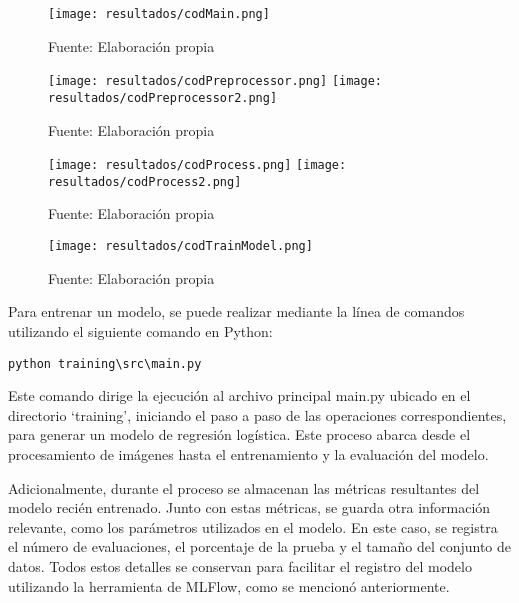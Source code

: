 \newpage

\begin{figure}[h]
\centering
\caption{Código del archivo main.py}
\texttt{[image: resultados/codMain.png]}
\caption*{\footnotesize Fuente: Elaboración propia}
\label{fig:figuraCodMain}
\end{figure}

\newpage

\begin{figure}[h]
\centering
\caption{Código del archivo preprocessor.py}
\texttt{[image: resultados/codPreprocessor.png]}
\texttt{[image: resultados/codPreprocessor2.png]}
\caption*{\footnotesize Fuente: Elaboración propia}
\label{fig:figuraCodPreprocessor}
\end{figure}

\newpage

\begin{figure}[h]
\centering
\caption{Código del archivo process.py}
\texttt{[image: resultados/codProcess.png]}
\texttt{[image: resultados/codProcess2.png]}
\caption*{\footnotesize Fuente: Elaboración propia}
\label{fig:figuraCodProcess}
\end{figure}

\newpage

\begin{figure}[h]
\centering
\caption{Código del archivo train\_model.py}
\texttt{[image: resultados/codTrainModel.png]}
\caption*{\footnotesize Fuente: Elaboración propia}
\label{fig:figuraCodTrainModel}
\end{figure}

Para entrenar un modelo, se puede realizar mediante la línea de comandos utilizando el siguiente comando en Python: 
\begin{verbatim}
python training\src\main.py
\end{verbatim}

\newpage

Este comando dirige la ejecución al archivo principal main.py ubicado en el directorio `training', iniciando el paso a paso de las operaciones correspondientes, para generar un modelo de regresión logística. Este proceso abarca desde el procesamiento de imágenes hasta el entrenamiento y la evaluación del modelo. \newline

Adicionalmente, durante el proceso se almacenan las métricas resultantes del modelo recién entrenado. Junto con estas métricas, se guarda otra información relevante, como los parámetros utilizados en el modelo. En este caso, se registra el número de evaluaciones, el porcentaje de la prueba y el tamaño del conjunto de datos. Todos estos detalles se conservan para facilitar el registro del modelo utilizando la herramienta de MLFlow, como se mencionó anteriormente.

